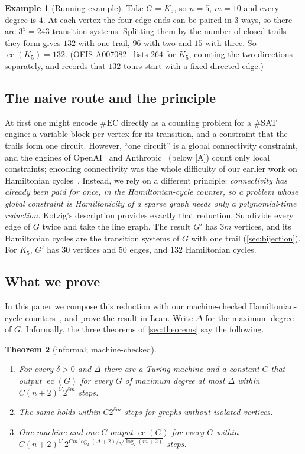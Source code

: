 \documentclass[10pt]{amsart}
\theoremstyle{plain}
\newtheorem{theorem}{Theorem}[section]
\theoremstyle{definition}
\newtheorem{example}[theorem]{Example}
\theoremstyle{remark}
\numberwithin{equation}{section}
\newcommand{\A}{\textup{[A]}}
\newcommand{\EC}{\operatorname{ec}}
\begin{document}
\begin{example}[Running example]\label{ex:k5}
Take $G=K_5$, so $n=5$, $m=10$ and every degree is $4$. At each vertex the four edge ends can be
paired in $3$ ways, so there are $3^5=243$ transition systems. Splitting them by the number of closed
trails they form gives $132$ with one trail, $96$ with two and $15$ with three. So $\EC(K_5)=132$.
(OEIS A007082~\cite{OEIS} lists $264$ for $K_5$, counting the two directions separately, and records
that $132$ tours start with a fixed directed edge.)
\end{example}

\subsection{The naive route and the principle}
At first one might encode $\#\mathrm{EC}$ directly as a counting problem for a $\#$SAT engine:
a variable block per vertex for its transition, and a constraint that the trails form one circuit.
However, ``one circuit'' is a global connectivity constraint, and the engines of
OpenAI~\cite{OpenAI26} and Anthropic~\cite{Anthropic26} (below \A) count only local constraints;
encoding connectivity was the whole difficulty of our earlier work on Hamiltonian
cycles~\cite{Tulsyan26}. Instead, we rely on a different principle: \emph{connectivity has already
been paid for once, in the Hamiltonian-cycle counter, so a problem whose global constraint is
Hamiltonicity of a sparse graph needs only a polynomial-time reduction.} Kotzig's description provides
exactly that reduction. Subdivide every edge of $G$ twice and take the line graph. The result $G'$
has $3m$ vertices, and its Hamiltonian cycles are the transition systems of $G$ with one trail
(\cref{sec:bijection}). For $K_5$, $G'$ has $30$ vertices and $50$ edges, and $132$ Hamiltonian
cycles.

\subsection{What we prove}
In this paper we compose this reduction with our machine-checked Hamiltonian-cycle
counters~\cite{Tulsyan26}, and prove the result in Lean. Write $\Delta$ for the maximum degree of
$G$. Informally, the three theorems of \cref{sec:theorems} say the following.

\begin{theorem}[informal; machine-checked]\label{thm:informal}
\leavevmode
\begin{enumerate}[label=\textup{(\alph*)}]
\item For every $\delta>0$ and $\Delta$ there are a Turing machine and a constant $C$ that output
$\EC(G)$ for every $G$ of maximum degree at most $\Delta$ within $C(n+2)^C2^{\delta m}$ steps.
\item The same holds within $C2^{\delta m}$ steps for graphs without isolated vertices.
\item One machine and one $C$ output $\EC(G)$ for every $G$ within
$C(n+2)^C\,2^{Cm\log_2(\Delta+2)/\sqrt{\log_2(m+2)}}$ steps.
\end{enumerate}
\end{theorem}
\end{document}
